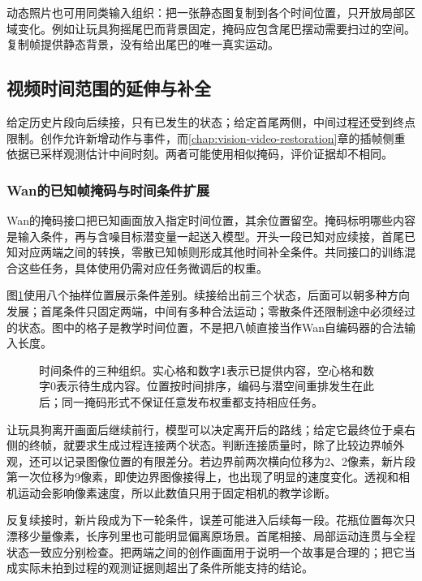 动态照片也可用同类输入组织：把一张静态图复制到各个时间位置，只开放局部区域变化。例如让玩具狗摇尾巴而背景固定，掩码应包含尾巴摆动需要扫过的空间。复制帧提供静态背景，没有给出尾巴的唯一真实运动。

\subsection{视频时间范围的延伸与补全}
\label{sec:vision-multigen-extension}

给定历史片段向后续接，只有已发生的状态；给定首尾两侧，中间过程还受到终点限制。创作允许新增动作与事件，而\ref{chap:vision-video-restoration}章的插帧侧重依据已采样观测估计中间时刻。两者可能使用相似掩码，评价证据却不相同。

\subsubsection{Wan的已知帧掩码与时间条件扩展}
\label{sec:vision-multigen-wan-extension}

Wan的掩码接口把已知画面放入指定时间位置，其余位置留空。掩码标明哪些内容是输入条件，再与含噪目标潜变量一起送入模型。开头一段已知对应续接，首尾已知对应两端之间的转换，零散已知帧则形成其他时间补全条件。共同接口的训练混合这些任务，具体使用仍需对应任务微调后的权重。

图\ref{fig:vision-time-masks}使用八个抽样位置展示条件差别。续接给出前三个状态，后面可以朝多种方向发展；首尾条件只固定两端，中间有多种合法运动；零散条件还限制途中必须经过的状态。图中的格子是教学时间位置，不是把八帧直接当作Wan自编码器的合法输入长度。

\begin{figure}[htbp]
  \centering
  
  \caption{时间条件的三种组织。实心格和数字1表示已提供内容，空心格和数字0表示待生成内容。位置按时间排序，编码与潜空间重排发生在此后；同一掩码形式不保证任意发布权重都支持相应任务。}
  \label{fig:vision-time-masks}
\end{figure}
\FloatBarrier

让玩具狗离开画面后继续前行，模型可以决定离开后的路线；给定它最终位于桌右侧的终帧，就要求生成过程连接两个状态。判断连接质量时，除了比较边界帧外观，还可以记录图像位置的有限差分。若边界前两次横向位移为2、2像素，新片段第一次位移为9像素，即使边界图像接得上，也出现了明显的速度变化。透视和相机运动会影响像素速度，所以此数值只用于固定相机的教学诊断。

反复续接时，新片段成为下一轮条件，误差可能进入后续每一段。花瓶位置每次只漂移少量像素，长序列里也可能明显偏离原场景。首尾相接、局部运动连贯与全程状态一致应分别检查。把两端之间的创作画面用于说明一个故事是合理的；把它当成实际未拍到过程的观测证据则超出了条件所能支持的结论。

